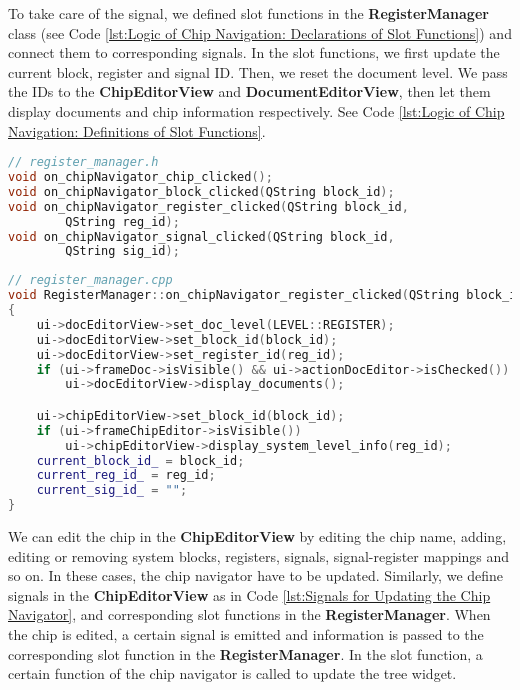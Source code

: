 To take care of the signal, we defined slot functions in the \textbf{RegisterManager} class (see Code \ref{lst:Logic of Chip Navigation: Declarations of Slot Functions}) and connect them to corresponding signals. In the slot functions, we first update the current block, register and signal ID. Then, we reset the document level. We pass the IDs to the \textbf{ChipEditorView} and \textbf{DocumentEditorView}, then let them display documents and chip information respectively. See Code \ref{lst:Logic of Chip Navigation: Definitions of Slot Functions}.

\begin{lstlisting}[language=C++, caption={Logic of Chip Navigation: Declarations of Slot Functions\label{lst:Logic of Chip Navigation: Declarations of Slot Functions}}]
// register_manager.h
void on_chipNavigator_chip_clicked();
void on_chipNavigator_block_clicked(QString block_id);
void on_chipNavigator_register_clicked(QString block_id, 
        QString reg_id);
void on_chipNavigator_signal_clicked(QString block_id,
        QString sig_id);
\end{lstlisting}

\begin{lstlisting}[language=C++, caption={Logic of Chip Navigation: Definitions of Slot Functions\label{lst:Logic of Chip Navigation: Definitions of Slot Functions}}]
// register_manager.cpp
void RegisterManager::on_chipNavigator_register_clicked(QString block_id, QString reg_id)
{
    ui->docEditorView->set_doc_level(LEVEL::REGISTER);
    ui->docEditorView->set_block_id(block_id);
    ui->docEditorView->set_register_id(reg_id);
    if (ui->frameDoc->isVisible() && ui->actionDocEditor->isChecked()) 
        ui->docEditorView->display_documents();

    ui->chipEditorView->set_block_id(block_id);
    if (ui->frameChipEditor->isVisible()) 
        ui->chipEditorView->display_system_level_info(reg_id);
    current_block_id_ = block_id;
    current_reg_id_ = reg_id;
    current_sig_id_ = "";
}
\end{lstlisting}

We can edit the chip in the \textbf{ChipEditorView} by editing the chip name, adding, editing or removing system blocks, registers, signals, signal-register mappings and so on. In these cases, the chip navigator have to be updated. Similarly, we define signals in the \textbf{ChipEditorView} as in Code \ref{lst:Signals for Updating the Chip Navigator}, and corresponding slot functions in the \textbf{RegisterManager}. When the chip is edited, a certain signal is emitted and information is passed to the corresponding slot function in the \textbf{RegisterManager}. In the slot function, a certain function of the chip navigator is called to update the tree widget.

